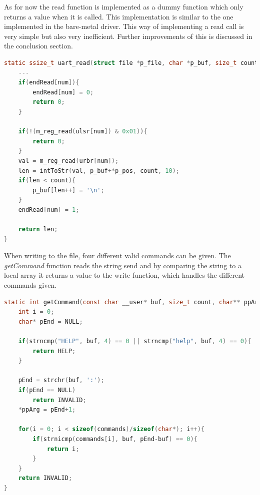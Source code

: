 As for now the read function is implemented as a dummy function which only returns a value when it is called. This implementation is similar to the one implemented in the bare-metal driver. This way of implementing a read call is very simple but also very inefficient. Further improvements of this is discussed in the conclusion section. 
\begin{lstlisting}[language=c]
static ssize_t uart_read(struct file *p_file, char *p_buf, size_t count, loff_t *p_pos){
	---
	if(endRead[num]){
		endRead[num] = 0;
		return 0;
	}

	if(!(m_reg_read(ulsr[num]) & 0x01)){
		return 0;
	}
	val = m_reg_read(urbr[num]);
	len = intToStr(val, p_buf+*p_pos, count, 10);
	if(len < count){
		p_buf[len++] = '\n';
	}
	endRead[num] = 1;

	return len;
}
\end{lstlisting}

When writing to the file, four different valid commands can be given. The \textit{getCommand} function reads the string send and by comparing the string to a local array it returns a value to the write function, which handles the different commands given. 
\begin{lstlisting}[language=c]
static int getCommand(const char __user* buf, size_t count, char** ppArg){
	int i = 0;
	char* pEnd = NULL;

	if(strncmp("HELP", buf, 4) == 0 || strncmp("help", buf, 4) == 0){
		return HELP;
	}

	pEnd = strchr(buf, ':');
	if(pEnd == NULL)
		return INVALID;
	*ppArg = pEnd+1;

	for(i = 0; i < sizeof(commands)/sizeof(char*); i++){
		if(strnicmp(commands[i], buf, pEnd-buf) == 0){	
			return i;
		}
	}
	return INVALID;
}
\end{lstlisting}


